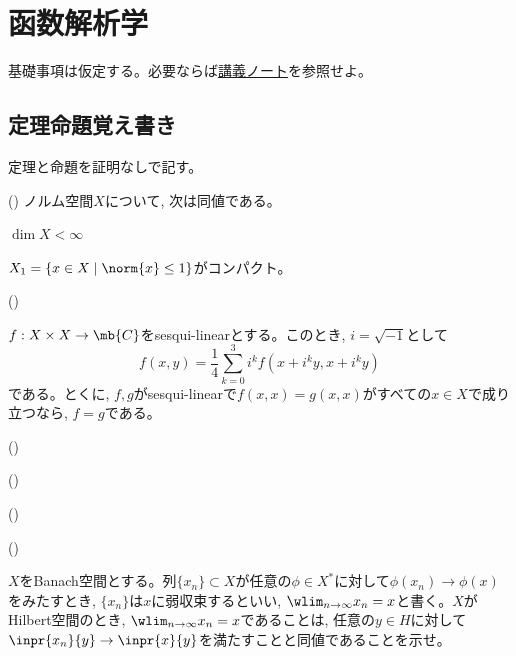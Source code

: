 \chapter{函数解析学}
基礎事項は仮定する。必要ならば\href{}{講義ノート}を参照せよ。

\section{定理命題覚え書き}
定理と命題を証明なしで記す。

\begin{theo} ()
ノルム空間$X$について, 次は同値である。
\ben
\item $\dim{X} < \infty$
\item $X_1 = \{ x\in X\mid \norm{x} \leq 1 \}$がコンパクト。
\een
\end{theo}

\begin{theo} ()

\end{theo}

\begin{prop}
$f:X\times X\to \mb{C}$をsesqui-linearとする。このとき, $i=\sqrt{-1}$として
\[f(x,y) = \dfrac{1}{4} \sum_{k=0}^{3} i^{k}f(x+i^{k}y, x+i^{k}y)\]
である。とくに, $f,g$がsesqui-linearで$f(x,x) = g(x,x)$がすべての$x\in X$で成り立つなら, $f=g$である。
\end{prop}

\begin{theo} ()

\end{theo}

\begin{prop} ()

\end{prop}

\begin{theo} ()

\end{theo}

\begin{theo} ()

\end{theo}

\begin{prac}
$X$をBanach空間とする。列$\{ x_n \}\subset X$が任意の$\phi\in X^{\ast}$に対して$\phi(x_n)\to \phi(x)$をみたすとき, $\{ x_n \}$は$x$に弱収束するといい, $\wlim_{n\to \infty} x_n = x$と書く。$X$がHilbert空間のとき, $\wlim_{n\to \infty} x_n = x$であることは, 任意の$y\in H$に対して$\inpr{x_n}{y} \to \inpr{x}{y}$を満たすことと同値であることを示せ。
\end{prac}


